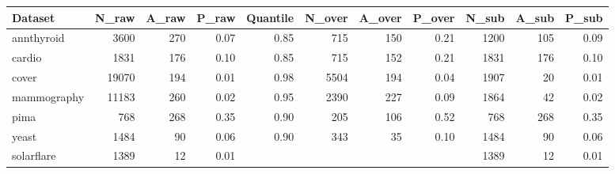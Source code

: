 \begin{tabular}{l|rrr|rrrr|rrr}
  \toprule
Dataset & N\_raw & A\_raw & P\_raw & Quantile & N\_over & A\_over & P\_over & N\_sub & A\_sub & P\_sub \\ 
  \midrule
annthyroid & 3600 & 270 & 0.07 & 0.85 & 715 & 150 & 0.21 & 1200 & 105 & 0.09 \\ 
  cardio & 1831 & 176 & 0.10 & 0.85 & 715 & 152 & 0.21 & 1831 & 176 & 0.10 \\ 
  cover & 19070 & 194 & 0.01 & 0.98 & 5504 & 194 & 0.04 & 1907 &  20 & 0.01 \\ 
  mammography & 11183 & 260 & 0.02 & 0.95 & 2390 & 227 & 0.09 & 1864 &  42 & 0.02 \\ 
  pima & 768 & 268 & 0.35 & 0.90 & 205 & 106 & 0.52 & 768 & 268 & 0.35 \\ 
  yeast & 1484 &  90 & 0.06 & 0.90 & 343 &  35 & 0.10 & 1484 &  90 & 0.06 \\ 
  solarflare & 1389 &  12 & 0.01 &  &  &  &  & 1389 &  12 & 0.01 \\ 
   \bottomrule
\end{tabular}
